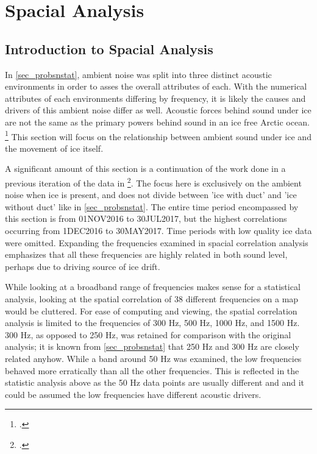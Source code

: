 
\chapter{Spacial Analysis} \label{chap_spacial}

\section{Introduction to Spacial Analysis} \label{sec_intro_spac}

In \autoref{sec_probsnstat}, ambient noise was split into three distinct acoustic environments in order to asses the overall attributes of each. With the numerical attributes of each environments differing by frequency, it is likely the causes and drivers of this ambient noise differ as well. Acoustic forces behind sound under ice are not the same as the primary powers behind sound in an ice free Arctic ocean. \footcite[]{icesound} This section will focus on the relationship between ambient sound under ice and the movement of ice itself.

A significant amount of this section is a continuation of the work done in a previous iteration of the data in \footcite[]{BonnelMain}. The focus here is exclusively on the ambient noise when ice is present, and does not divide between 'ice with duct' and 'ice without duct' like in \autoref{sec_probsnstat}. The entire time period encompassed by this section is from 01NOV2016 to 30JUL2017, but the highest correlations occurring from 1DEC2016 to 30MAY2017. Time periods with low quality ice data were omitted. Expanding the frequencies examined in spacial correlation analysis emphasizes that all these frequencies are highly related in both sound level, perhaps due to driving source of ice drift. %

While looking at a broadband range of frequencies makes sense for a statistical analysis, looking at the spatial correlation of 38 different frequencies on a map would be cluttered. For ease of computing and viewing, the spatial correlation analysis is limited to the frequencies of 300 Hz, 500 Hz, 1000 Hz, and 1500 Hz. 300 Hz, as opposed to 250 Hz, was retained for comparison with the original analysis; it is known from \autoref{sec_probsnstat} that 250 Hz and 300 Hz are closely related anyhow. While a band around 50 Hz was examined, the low frequencies behaved more erratically than all the other frequencies. This is reflected in the statistic analysis above as the 50 Hz data points are usually different and and it could be assumed the low frequencies have different acoustic drivers. 

